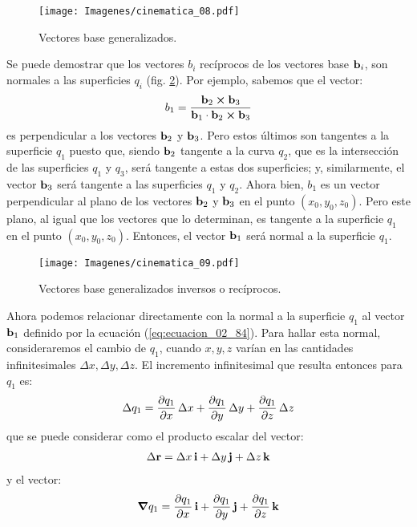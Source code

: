 \documentclass[12pt]{article}
\begin{document}
\begin{figure}[H]
    \centering
    \texttt{[image: Imagenes/cinematica\_08.pdf]}
    \caption{Vectores base generalizados.}
    \label{fig:figura_02_08}
\end{figure}
Se puede demostrar que los vectores $b_{i}$ recíprocos de los vectores base $\vb{b}_{i}$, son normales a las superficies $q_{i}$ (fig. \ref{fig:figura_02_09}). Por ejemplo, sabemos que el vector:
\begin{align}
    b_{1} = \dfrac{\vb{b}_{2} \cp \vb{b}_{3}}{\vb{b}_{1} \cdot \vb{b}_{2} \cp \vb{b}_{3}}
    \label{eq:ecuacion_02_84}
\end{align}
es perpendicular a los vectores $\vb{b}_{2}$ y $\vb{b}_{3}$. Pero estos últimos son tangentes a la superficie $q_{1}$ puesto que, siendo $\vb{b}_{2}$ tangente a la curva $q_{2}$, que es la intersección de las superficies $q_{1}$ y $q_{3}$, será tangente a estas dos superficies; y, similarmente, el vector $\vb{b}_{3}$ será tangente a las superficies $q_{1}$ y $q_{2}$. Ahora bien, $b_{1}$ es un vector perpendicular al plano de los vectores $\vb{b}_{2}$ y $\vb{b}_{3}$ en el punto $( x_{0}, y_{0}, z_{0})$. Pero este plano, al igual que los vectores que lo determinan, es tangente a la superficie $q_{1}$ en el punto $(x_{0}, y_{0}, z_{0})$. Entonces, el vector $\vb{b}_{1}$ será normal a la superficie $q_{1}$.
\begin{figure}[H]
    \centering
    \texttt{[image: Imagenes/cinematica\_09.pdf]}
    \caption{Vectores base generalizados inversos o recíprocos.}
    \label{fig:figura_02_09}
\end{figure}
Ahora podemos relacionar directamente con la normal a la superficie $q_{1}$ al vector $\vb{b}_{1}$ definido por la ecuación (\ref{eq:ecuacion_02_84}). Para hallar esta normal, consideraremos el cambio de $q_{1}$, cuando $x, y, z$ varían en las cantidades infinitesimales $\Delta x, \Delta y, \Delta z$. El incremento infinitesimal que resulta entonces para $q_{1}$ es:
\begin{align}
    \Delta q_{1} = \pdv{q_{1}}{x} \, \Delta x + \pdv{q_{1}}{y} \, \Delta y + \pdv{q_{1}}{z} \, \Delta z
    \label{eq:ecuacion_02_85}
\end{align} 
que se puede considerar como el producto escalar del vector:
\begin{align}
    \Delta \vb{r} = \Delta x \, \vb{i} + \Delta y \, \vb{j} + \Delta z \, \vb{k}
    \label{eq:ecuacion_02_86}
\end{align}
y el vector:
\begin{align}
    \grad{q_{1}} = \pdv{q_{1}}{x} \, \vb{i} + \pdv{q_{1}}{y} \, \vb{j} + \pdv{q_{1}}{z} \, \vb{k}
    \label{eq:ecuacion_02_87}
\end{align}
\end{document}
